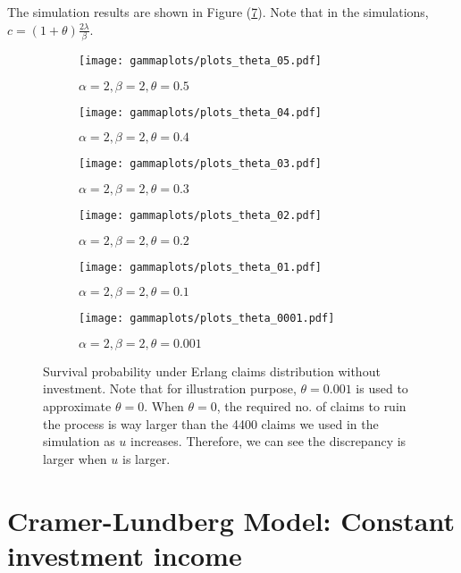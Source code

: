 \documentclass[12pt]{article}
\begin{document}
    The simulation results are shown in Figure (\ref{fig:image2}). Note that in the simulations, \(c=(1+\theta)\frac{2\lambda}{\beta}\).
\begin{figure}[!htbp]
\begin{subfigure}{0.5\textwidth}
\texttt{[image: gammaplots/plots\_theta\_05.pdf]} 
\caption{\(\alpha=2, \beta=2, \theta=0.5\)}
\label{gamma_noinv_theta05}
\end{subfigure}
\begin{subfigure}{0.5\textwidth}
\texttt{[image: gammaplots/plots\_theta\_04.pdf]} 
\caption{\(\alpha=2, \beta=2, \theta=0.4\)}
\label{gamma_noinv_theta04}
\end{subfigure}
\begin{subfigure}{0.5\textwidth}
\texttt{[image: gammaplots/plots\_theta\_03.pdf]} 
\caption{\(\alpha=2, \beta=2, \theta=0.3\)}
\label{gamma_noinv_theta03}
\end{subfigure}
\begin{subfigure}{0.5\textwidth}
\texttt{[image: gammaplots/plots\_theta\_02.pdf]} 
\caption{\(\alpha=2, \beta=2, \theta=0.2\)}
\label{gamma_noinv_theta02}
\end{subfigure}
\begin{subfigure}{0.5\textwidth}
\texttt{[image: gammaplots/plots\_theta\_01.pdf]} 
\caption{\(\alpha=2, \beta=2, \theta=0.1\)}
\label{gamma_noinv_theta01}
\end{subfigure}
\begin{subfigure}{0.5\textwidth}
\texttt{[image: gammaplots/plots\_theta\_0001.pdf]} 
\caption{\(\alpha=2, \beta=2, \theta=0.001\)}
\label{gamma_noinv_theta0001}
\end{subfigure}
\caption{Survival probability under Erlang claims distribution without investment. Note that for illustration purpose, \(\theta=0.001\) is used to approximate \(\theta=0\). When \(\theta=0\), the required no. of claims to ruin the process is way larger than the 4400 claims we used in the simulation as \(u\) increases. Therefore, we can see the discrepancy is larger when \(u\) is larger.}
\vspace{-10pt}
\label{fig:image2}
\end{figure}

\newpage
\section{Cramer-Lundberg Model: Constant investment income}
\end{document}
